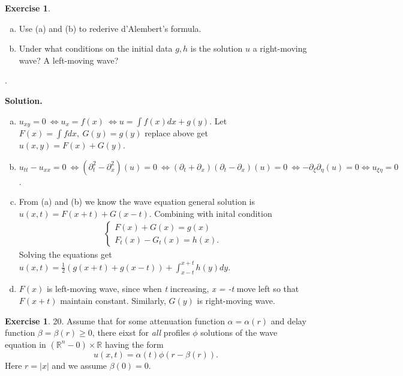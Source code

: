 \message{ !name(PDE-hw5-21935004-\unexpanded{谭焱}.tex)}\documentclass[a4paper]{book}
\newenvironment{solution}%
{\noindent\textbf{Solution.}}%
{\qedhere}
\numberwithin{equation}{chapter}
\theoremstyle{definition}
\newtheorem{exc}[exm]{Exercise}
\begin{document}
\begin{multicols}{2}
\begin{exc}
\begin{enumerate} [(a)]
  \item Use (a) and (b) to rederive d'Alembert's formula.

  \item Under what conditions on the initial data $g,h$ is the solution $u$ a right-moving wave? A left-moving wave?
    
  \end{enumerate}.
\end{exc}

\begin{solution}
  \begin{enumerate}[(a)]
  \item $u_{xy} = 0\ \Longleftrightarrow u_x = f(x)\ \Longleftrightarrow u = \int f(x)dx + g(y)$. Let $F(x) = \int f dx, \ G(y) = g(y)$ replace above get $u(x,y) = F(x) + G(y)$.

  \item $u_{tt} - u_{xx} = 0\ \Longleftrightarrow (\partial^2_t - \partial^2_x)(u) = 0\ \Longleftrightarrow (\partial_t + \partial_x)(\partial_t - \partial_x)(u) = 0 \ \Longleftrightarrow -\partial_{\xi} \partial_\eta (u) = 0 \Longleftrightarrow u_{\xi \eta} = 0$.

  \item From (a) and (b) we know the wave equation general solution is $u(x,t) = F(x+t) + G(x-t)$. Combining with inital condition
    \begin{align*}
      \begin{cases}
        F(x) + G(x) = g(x)   \\
        F_t(x) - G_t(x) = h(x).
      \end{cases}
    \end{align*}
    Solving the equations get $u(x,t) = \frac{1}{2}(g(x+t) + g(x-t)) + \int_{x-t}^{x+t} h(y) dy$.

    \item $F(x)$ is left-moving wave, since when \textit{t} increasing, \textit{x = -t} move left so that $F(x+t)$ maintain constant. Similarly, $G(y)$ is right-moving wave.
  \end{enumerate}
\end{solution}

\begin{exc}
  20.
  Assume that for some attenuation function $\alpha = \alpha(r) $ and delay function $\beta = \beta(r) \geq 0$, there eixst for \textit{all} profiles $\phi$ solutions of the wave equation in $(\mathbb{R}^n - {0}) \times \mathbb{R}$ having the form
  \begin{equation}
    \label{eq:3}
    u(x,t) = \alpha(t) \phi(r - \beta(r)).
  \end{equation}
  Here $r = |x|$ and we assume $\beta(0) = 0$.


\end{exc}
\end{multicols}
\end{document}
